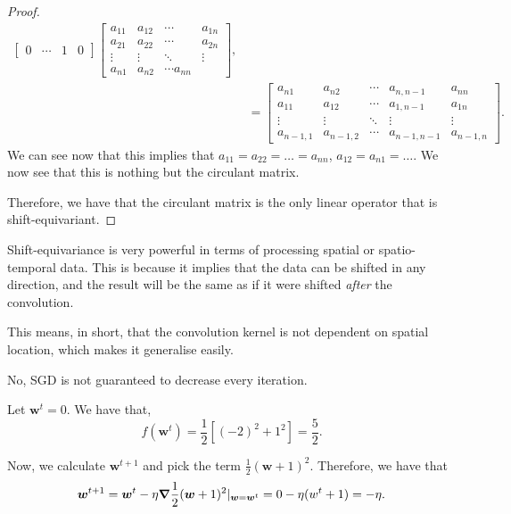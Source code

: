 \documentclass[twoside]{article}
\begin{document}
\begin{proof}
\begin{align*}
\begin{bmatrix}
			0 & \cdots & 1      & 0
		\end{bmatrix}
		\begin{bmatrix}
			a_{11} & a_{12} & \cdots        & a_{1n} \\
			a_{21} & a_{22} & \cdots        & a_{2n} \\
			\vdots & \vdots & \ddots        & \vdots \\
			a_{n1} & a_{n2} & \cdots a_{nn}
		\end{bmatrix}, \\
		 & =
		\begin{bmatrix}
			a_{n1}       & a_{n2}       & \cdots & a_{n, n-1}     & a_{nn}       \\
			a_{11}       & a_{12}       & \cdots & a_{1, n - 1}   & a_{1n}       \\
			\vdots       & \vdots       & \ddots & \vdots         & \vdots       \\
			a_{n - 1, 1} & a_{n - 1, 2} & \cdots & a_{n - 1, n-1} & a_{n - 1, n}
		\end{bmatrix}.
	\end{align*}
	We can see now that this implies that $a_{11} = a_{22} = \dots = a_{nn}$,
	$a_{12} = a_{n1} = \dots$. We now see that this is nothing
	but the circulant matrix.

	Therefore, we have that the circulant matrix is the only linear operator that
	is shift-equivariant.
\end{proof}

Shift-equivariance is very powerful in terms of processing spatial or spatio-temporal data.
This is because it implies that the data can be shifted in any direction, and the result
will be the same as if it were shifted \textit{after} the convolution.

This means, in short, that the convolution kernel is not dependent on spatial location,
which makes it generalise easily.

No, SGD is not guaranteed to decrease every iteration.

Let $\bm{w}^{t} = 0$. We have that,
\begin{equation*}
    f(\bm{w}^{t}) = \frac{1}{2}[(-2)^{2} + 1^{2}] = \frac{5}{2}.
\end{equation*}

Now, we calculate $\bm{w}^{t + 1}$ and pick the term $\frac{1}{2}(\bm{w} + 1)^{2}$.
Therefore, we have that
\begin{equation*}
    \bm{w}^{t+1} = \bm{w}^{t} - \eta \grad \frac{1}{2}(\bm{w} + 1)^{2} |_{\bm{w} = \bm{w}^{t}}
    = 0 - \eta(w^{t} + 1) = -\eta.
\end{equation*}
\end{document}
